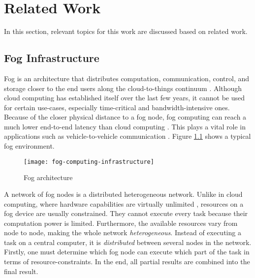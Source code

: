 \chapter{Related Work\label{cha:relwork}}
In this section, relevant topics for this work are discussed based on related work.

\section{Fog Infrastructure}
Fog is an architecture that distributes computation, communication, control, and storage closer to the end users along the cloud-to-things continuum \cite{fog-research-opportunities}.
Although cloud computing has established itself over the last few years, it cannot be used for certain use-cases, especially time-critical and bandwidth-intensive ones. Because of the closer physical distance to a fog node, fog computing can reach a much lower end-to-end latency than cloud computing \cite{mobility-aware-scheduling}\cite{novel-load-balancing}.
This plays a vital role in applications such as vehicle-to-vehicle communication \cite{novel-load-balancing}.
Figure \ref{fig:foginfrastructure} shows a typical fog environment.\\

\begin{figure}[htb]
    \centering
    \texttt{[image: fog-computing-infrastructure]}
    \caption{Fog architecture}
    \label{fig:foginfrastructure}
\end{figure}

A network of fog nodes is a distributed heterogeneous network. Unlike in cloud computing, where hardware capabilities are virtually unlimited \cite{fogtorch}, resources on a fog device are usually constrained. They cannot execute every task because their computation power is limited. Furthermore, the available resources vary from node to node, making the whole network \textit{heterogeneous}. Instead of executing a task on a central computer, it is \textit{distributed} between several nodes in the network.
Firstly, one must determine which fog node can execute which part of the task in terms of resource-constraints.
In the end, all partial results are combined into the final result.


